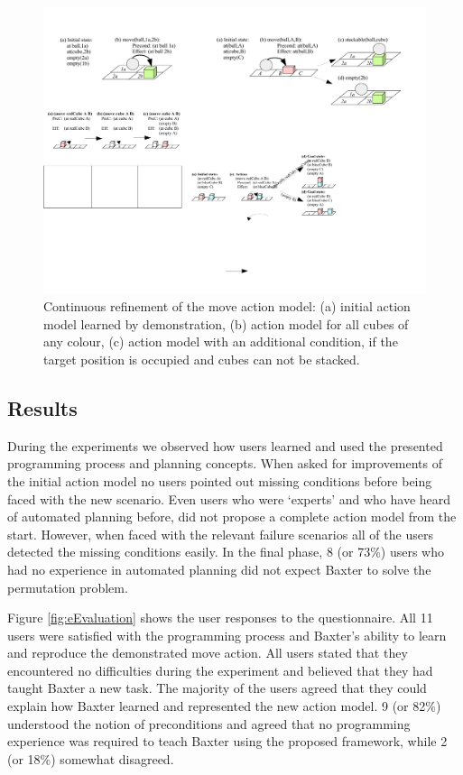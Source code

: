\begin{figure}[h]
	\centering
	\includegraphics[width=0.85\linewidth]{figures/scenarios-exp2}
	\caption{Continuous refinement of the move action model: (a) initial action model learned by demonstration, (b) action model for all cubes of any colour, (c) action model with an additional condition, if the target position is occupied and cubes can not be stacked.}
	\label{fig:scenarios-exp2}
\end{figure} 
\subsection{Results}
During the experiments we observed how users learned and used the presented programming process and planning concepts.
When asked for improvements of the initial action model no users pointed out missing conditions before being faced with the new scenario.
Even users who were `experts' and who have heard of automated planning before, did not propose a complete action model from the start. 
However, when faced with the relevant failure scenarios all of the users detected the missing conditions easily.
In the final phase, 8 (or 73\%) users who had no experience in automated planning did not expect Baxter to solve the permutation problem. 

Figure \ref{fig:eEvaluation} shows the user responses to the questionnaire.
All 11 users were satisfied with the programming process and Baxter's ability to learn and reproduce the demonstrated move action. 
All users stated that they encountered no difficulties during the experiment and believed that they had taught Baxter a new task. 
The majority of the users agreed that they could explain how Baxter learned and represented the new action model.
9 (or 82\%) understood the notion of preconditions and agreed that no programming experience was required to teach Baxter using the proposed framework, while 2 (or 18\%) somewhat disagreed.


